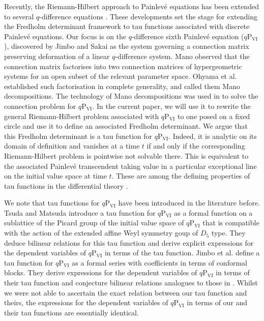 \documentclass[a4paper,reqno,11pt]{amsart}
\numberwithin{equation}{section}
\numberwithin{figure}{section}
\theoremstyle{plain}
\theoremstyle{remark}
\newcommand\Psix{\textrm{P}_{\textrm{VI}}}
\numberwithin{rhp}{section}
\begin{document}
Recently, the Riemann-Hilbert approach to Painlev\'e equations has been extended to several $q$-difference equations \cite{gavrylenko2025riemannhilbertproblemsfredholmdeterminants,JR21,joshi_rof_qpvi,ORS20}. These developments set the stage for extending the Fredholm determinant framework to tau functions associated with discrete Painlev\'e equations. Our focus is on the $q$-difference sixth Painlev\'e equation ($q\Psix$), discovered by Jimbo and Sakai \cite{jimbo1996q} as the system governing a connection matrix preserving deformation of a linear $q$-difference system. Mano \cite{mano_qpvi} observed that the connection matrix factorises into two connection matrices of hypergeometric systems for an open subset of the relevant parameter space.  Ohyama et al. \cite{ORS20} established such factorisation in complete generality,
and called them Mano decompositions. The technology of Mano decompositions was used in \cite{roffelsen2024segre} to solve the connection problem for $q\Psix$. In the current paper, we will use it to rewrite the general Riemann-Hilbert problem associated with $q\Psix$ to one posed on a fixed circle and use it to define an associated Fredholm determinant. We argue that this Fredholm determinant is a tau function for $q\Psix$. Indeed, it is analytic on its domain of definition and vanishes at a time $t$ if and only if the corresponding Riemann-Hilbert problem is pointwise not solvable there. This is equivalent to the associated Painlev\'e transcendent taking value in a particular exceptional line on the initial value space at time $t$. These are among the defining properties of tau functions in the differential theory \cite{miwatau81,okamoto81,palmer}.



We note that tau functions for $q\Psix$ have been introduced in the literature before. Tsuda and Matsuda \cite[Definition 1.3]{tsudamasuda} introduce a tau function for $q\Psix$ as a formal function on a sublattice of the Picard group of the initial value space of $q\Psix$ that is compatible with the action of the extended
 affine Weyl symmetry goup of $D_5$ type. They deduce bilinear relations for this tau function and derive explicit expressions for the dependent variables of $q\Psix$ in terms of the tau function.
Jimbo et al. \cite{JNS2017} define a tau function for $q\Psix$ as a formal series with coefficients in terms of conformal blocks. They derive expressions for the dependent variables of $q\Psix$ in terms of their tau function and conjecture bilinear relations analogues to those in \cite{tsudamasuda}. Whilst we were not able to ascertain the exact relation between our tau function and theirs, the expressions for the dependent variables of $q\Psix$  in terms of our and their tau functions are essentially identical.
\end{document}
